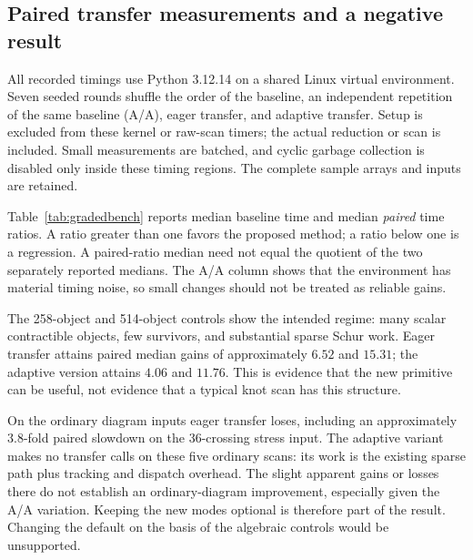 \subsection{Paired transfer measurements and a negative result}
All recorded timings use Python 3.12.14 on a shared Linux virtual environment. Seven seeded rounds shuffle the order of the baseline, an independent repetition of the same baseline (A/A), eager transfer, and adaptive transfer. Setup is excluded from these kernel or raw-scan timers; the actual reduction or scan is included. Small measurements are batched, and cyclic garbage collection is disabled only inside these timing regions. The complete sample arrays and inputs are retained.

Table~\ref{tab:gradedbench} reports median baseline time and median \emph{paired} time ratios. A ratio greater than one favors the proposed method; a ratio below one is a regression. A paired-ratio median need not equal the quotient of the two separately reported medians. The A/A column shows that the environment has material timing noise, so small changes should not be treated as reliable gains.

\begin{table}[htbp]
\centering\small

\caption{Transfer measurements. The last four rows are valid algebraic controls, not diagram inputs; each has two survivors and a nonzero minimal differential. Ratios are baseline time divided by the indicated arm's time.}
\label{tab:gradedbench}
\end{table}

The 258-object and 514-object controls show the intended regime: many scalar contractible objects, few survivors, and substantial sparse Schur work. Eager transfer attains paired median gains of approximately $6.52$ and $15.31$; the adaptive version attains $4.06$ and $11.76$. This is evidence that the new primitive can be useful, not evidence that a typical knot scan has this structure.

On the ordinary diagram inputs eager transfer loses, including an approximately $3.8$-fold paired slowdown on the 36-crossing stress input. The adaptive variant makes no transfer calls on these five ordinary scans: its work is the existing sparse path plus tracking and dispatch overhead. The slight apparent gains or losses there do not establish an ordinary-diagram improvement, especially given the A/A variation. Keeping the new modes optional is therefore part of the result. Changing the default on the basis of the algebraic controls would be unsupported.

